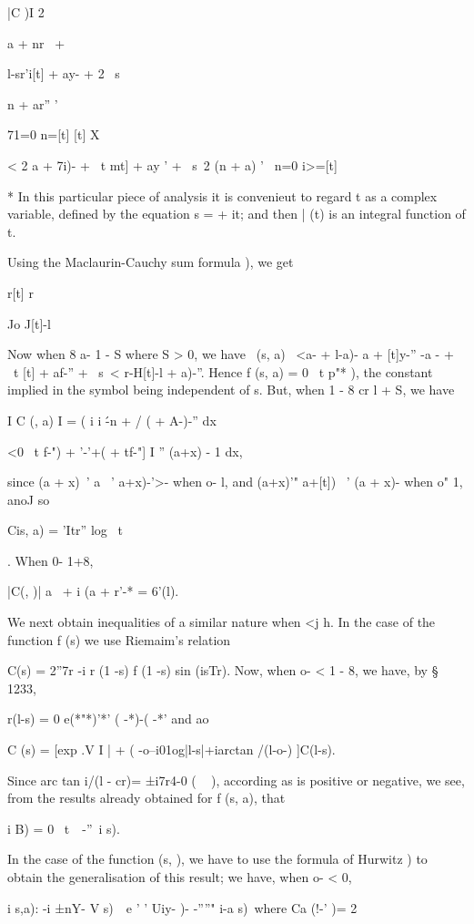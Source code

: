 |C )I 2 \ \ {a + nr \ + \ \ { l-sr'i[t] + ay- + 2 \ s\ \ {n + ar'' '

71=0 n=[t] [t] X

< 2 a + 7i)- + \ t mt] + ay ' + \ s\ 2 (n + a) ' \ n=0 i>=[t]

* In this particular piece of analysis it is convenieut to regard t as
a complex variable, defined by the equation s = + it; and then | (t)
is an integral function of t.

%
%

Using the Maclaurin-Cauchy sum formula ), we get

r[t] r

Jo J[t]-l

Now when 8 a- 1 - S where S > 0, we have \ (s, a) \ <a- + l-a)- a +
[t]y-'' -a - + \ t [t] + af-'' + \ s\ < r-H[t]-l + a)-''. Hence f (s,
a) = 0 \ t p"* ), the constant implied in the symbol being independent
of s. But, when 1 - 8 cr l + S, we have

I C (, a) I = ( i i \'-n + / ( + A-)-'' dx

<0 \ t f-") + '-'+( + tf-"] I '' (a+x) - 1 dx,

since (a + x)~' a ~' a+x)-'>- when o- l, and (a+x)'" a+[t]) ~' (a +
x)- when o" 1, anoJ so

Cis, a) = 'Itr'' log \ t\ \ }. When 0- 1+8,

|C(, )| a~ + i (a + r'-* = 6'(l).


We next obtain inequalities of a similar nature when <j h. In the case
of the function f (s) we use Riemaim's relation

C(s) = 2''7r -i r (1 -s) f (1 -s) sin (isTr). Now, when o- < 1 - 8, we
have, by § 1233,

r(l-s) = 0 e(*"*)'*' ( -*)-( -*' and ao

C (s) = [exp .V I | + ( -o--i01og|l-s|+iarctan /(l-o-) ]C(l-s).

Since arc tan i/(l - cr)= ±i7r4-0 ( ~ ), according as is positive or
negative, we see, from the results already obtained for f (s, a), that

i B) = 0 \ t\ \ -''\ i s).

In the case of the function (s, ), we have to use the formula of
Hurwitz ) to obtain the generalisation of this result; we
have, when o- < 0,

i s,a): -i ±nY- V s)\ \ e ' ' Uiy- )- -''''" i-a s)\ where Ca (!-' )=
2

}}
